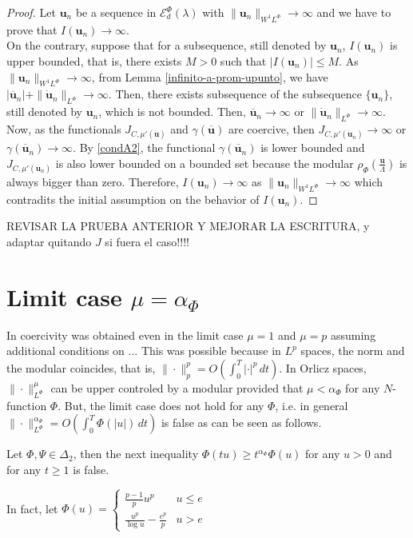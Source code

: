 \documentclass[twoside]{article}
\theoremstyle{remark}
\newcommand{\orlnor}{\|_{L^{\Phi}}}
\newcommand{\lphi}{L^{\Phi}}
\newcommand{\sobnor}{\|_{W^{1}\lphi}}
\newcommand{\domi}{\mathcal{E}^{\Phi}_d(\lambda)}
\renewcommand{\b}[1]{\boldsymbol{#1}}
\renewcommand{\leq}{\leqslant}
\begin{document}
\begin{proof}
Let $\b{u}_n$ be  a sequence in $\domi$ with 
$\|\b{u}_n\sobnor\to\infty$ and we have to prove that $I(\b{u}_n)\to\infty$. 
\\
On the contrary, suppose  that for a subsequence, 
still denoted by $\b{u}_n$, $I(\b{u}_n)$ is upper bounded, that is, there exists $M>0$ such that $|I(\b{u}_{n})|\leq M$. 
As $\|\b{u}_n\sobnor\to\infty$, from Lemma \ref{infinito-a-prom-upunto},  we have $|\overline{\b{u}}_n|+\|\b{\dot{u}}_n\orlnor\to \infty$.
Then, there exists subsequence of the subsequence $\{\b{u}_n\}$, still denoted by $\b{u}_n$, which is not bounded.
Then, 
$\b{\overline u}_n\to \infty$ or $\|\b{\dot{u}}_n\orlnor\to \infty$.
Now, as the functionals $J_{C,\mu'(\b{\dot u})}$ and $\gamma(\b{\overline{u}})$ are coercive, then 
$J_{C,\mu'(\b{\dot u}_n)} \to \infty$ or $\gamma(\b{\overline{u}}_n)\to \infty$.
By \eqref{condA2}, the functional $\gamma(\b{\overline{u}}_n)$ is lower bounded and 
$J_{C,\mu'(\b{\dot u}_n)}$ is also lower bounded on a bounded set because the modular $\rho_{\Phi}\left(\frac{\b{u}}{\Lambda}\right)$ is always bigger than zero. 
Therefore,  $I(\b{u}_n)\to\infty$ as $\|\b{u}_n\sobnor\to\infty$ which contradits the initial assumption on the behavior of $I(\b{u}_n)$. 
\end{proof}
REVISAR LA PRUEBA ANTERIOR Y MEJORAR LA ESCRITURA, y adaptar quitando $J$ si fuera el caso!!!!

\section{Limit case $\mu=\alpha_{\Phi}$}

In \cite{} coercivity was obtained even in the limit case $\mu=1$ and $\mu=p$ assuming additional conditions on ... 
This was possible because in $L^p$ spaces, the norm and the modular coincides, that is, $\|\cdot\|_p^p=O(\int_0^T |\cdot|^p\,dt)$.
In Orlicz spaces, $\|\cdot\orlnor^\mu$ can be upper controled by a modular provided that $\mu<\alpha_{\Phi}$ for any
$N$-function $\Phi$. But,  the limit case does  not hold for any $\Phi$, i.e. in general $\|\cdot\orlnor^{\alpha_{\Phi}}=O(\int_0^T \Phi(|u|)\,dt)$ is false as can be seen as follows.


Let $\Phi, \Psi \in \Delta_2$, then the next inequality $\Phi(tu)\geq t^{\alpha_{\Phi}}\Phi(u)$ for any $u>0$ and for any $t\geq 1$ is false.

In fact, let 
$\Phi(u)=
\left\{
\begin{array}{ll}
\frac{p-1}{p}u^p&u\leq e
\\
\frac{u^p}{\log u}-\frac{e^p}{p}&u>e
\end{array}
\right.$
\end{document}
